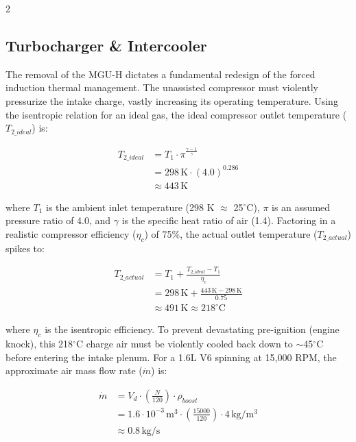 \begin{multicols}{2}
\subsection{Turbocharger \& Intercooler}

The removal of the MGU-H dictates a fundamental redesign of the forced induction thermal management. The unassisted compressor must violently pressurize the intake charge, vastly increasing its operating temperature. Using the isentropic relation for an ideal gas, the ideal compressor outlet temperature ($T_{2\_ideal}$) is:

\begin{equation} \label{eq:turbo_temp_ideal}
\begin{split}
T_{2\_ideal} &= T_1 \cdot \pi^{\frac{\gamma-1}{\gamma}} \\
&= 298\,\mathrm{K} \cdot (4.0)^{0.286} \\
&\approx 443\,\mathrm{K}
\end{split}
\end{equation}

where $T_1$ is the ambient inlet temperature (298 K $\approx$ 25$^\circ$C), $\pi$ is an assumed pressure ratio of 4.0, and $\gamma$ is the specific heat ratio of air (1.4). Factoring in a realistic compressor efficiency ($\eta_c$) of 75\%, the actual outlet temperature ($T_{2\_actual}$) spikes to:

\begin{equation} \label{eq:turbo_temp_actual}
\begin{split}
T_{2\_actual} &= T_1 + \frac{T_{2\_ideal} - T_1}{\eta_c} \\
&= 298\,\mathrm{K} + \frac{443\,\mathrm{K} - 298\,\mathrm{K}}{0.75} \\
&\approx 491\,\mathrm{K} \approx 218^\circ\mathrm{C}
\end{split}
\end{equation}

where $\eta_c$ is the isentropic efficiency. To prevent devastating pre-ignition (engine knock), this 218$^\circ$C charge air must be violently cooled back down to $\sim$45$^\circ$C before entering the intake plenum. For a 1.6L V6 spinning at 15,000 RPM, the approximate air mass flow rate ($\dot{m}$) is:

\begin{equation} \label{eq:mass_flow}
\begin{split}
\dot{m} &= V_d \cdot \left(\frac{N}{120}\right) \cdot \rho_{boost} \\
&= 1.6 \cdot 10^{-3}\,\mathrm{m^3} \cdot \left(\frac{15000}{120}\right) \cdot 4\,\mathrm{kg/m^3} \\
&\approx 0.8\,\mathrm{kg/s}
\end{split}
\end{equation}


\end{multicols}
